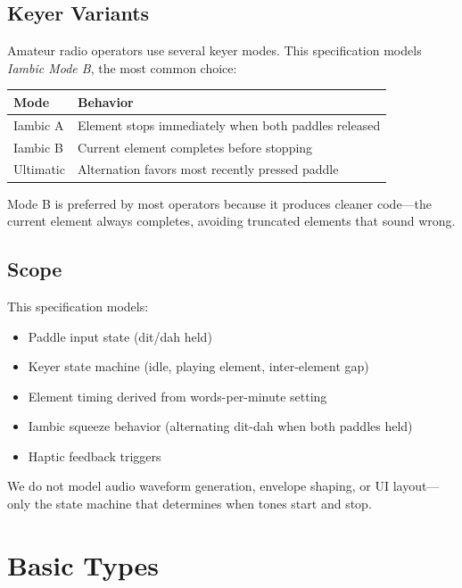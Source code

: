 \documentclass[a4paper,10pt,fleqn]{article}
\begin{document}
\subsection{Keyer Variants}

Amateur radio operators use several keyer modes. This specification models
\emph{Iambic Mode B}, the most common choice:

\begin{center}
\begin{tabular}{lp{8cm}}
\hline
Mode & Behavior \\
\hline
Iambic A & Element stops immediately when both paddles released \\
Iambic B & Current element completes before stopping \\
Ultimatic & Alternation favors most recently pressed paddle \\
\hline
\end{tabular}
\end{center}

Mode B is preferred by most operators because it produces cleaner code---the
current element always completes, avoiding truncated elements that sound wrong.

\subsection{Scope}

This specification models:

\begin{itemize}
\item Paddle input state (dit/dah held)
\item Keyer state machine (idle, playing element, inter-element gap)
\item Element timing derived from words-per-minute setting
\item Iambic squeeze behavior (alternating dit-dah when both paddles held)
\item Haptic feedback triggers
\end{itemize}

We do not model audio waveform generation, envelope shaping, or UI layout---only
the state machine that determines when tones start and stop.

\section{Basic Types}
\end{document}
